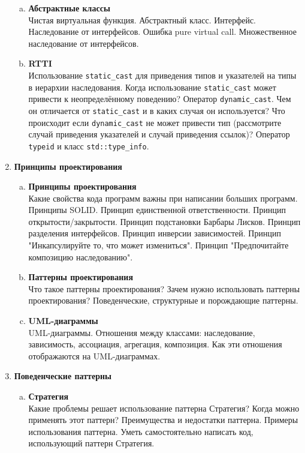 \documentclass{article}
\begin{document}
\begin{enumerate}
\begin{enumerate}[a.]
\item \textbf{Абстрактные классы}\\
Чистая виртуальная функция. Абстрактный класс. Интерфейс. Наследование от интерфейсов. Ошибка pure virtual call. Множественное наследование от интерфейсов.

\item \textbf{RTTI}\\
Использование \texttt{static\_cast} для приведения типов и указателей на типы в иерархии наследования. Когда использование \texttt{static\_cast} может привести к неопределённому поведению? Оператор \texttt{dynamic\_cast}. Чем он отличается от \texttt{static\_cast} и в каких случая он используется? Что происходит если \texttt{dynamic\_cast} не может привести тип (рассмотрите случай приведения указателей и случай приведения ссылок)? Оператор \texttt{typeid} и класс \texttt{std::type\_info}.

\end{enumerate}




\item \textbf{Принципы проектирования}
\begin{enumerate}[a.]

\item \textbf{Принципы проектирования}\\
Какие свойства кода программ важны при написании больших программ.
Принципы SOLID. Принцип единственной ответственности. Принцип открытости/закрытости. Принцип подстановки Барбары Лисков. Принцип разделения интерфейсов. Принцип инверсии зависимостей. 
Принцип "Инкапсулируйте то, что может измениться". Принцип "Предпочитайте композицию наследованию".

\item \textbf{Паттерны проектирования}\\
Что такое паттерны проектирования? Зачем нужно использовать паттерны проектирования? Поведенческие, структурные и порождающие паттерны.


\item \textbf{UML-диаграммы}\\
UML-диаграммы. Отношения между классами: наследование, зависимость, ассоциация, агрегация, композиция. Как эти отношения отображаются на UML-диаграммах.





\end{enumerate}


\item \textbf{Поведенческие паттерны}
\begin{enumerate}[a.]
\item \textbf{Стратегия}\\
Какие проблемы решает использование паттерна Стратегия? Когда можно применять этот паттерн? Преимущества и недостатки паттерна. Примеры использования паттерна. Уметь самостоятельно написать код, использующий паттерн Стратегия.


\end{enumerate}
\end{enumerate}
\end{document}
